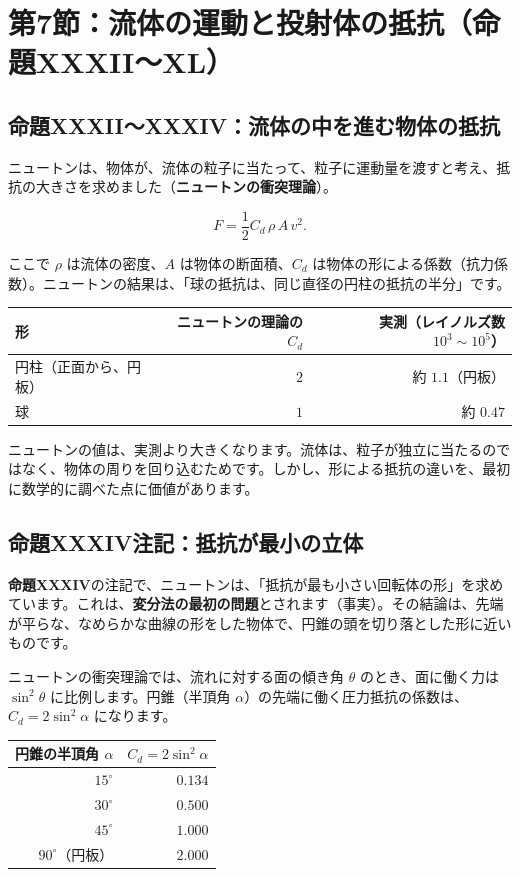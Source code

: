 \documentclass[a4paper,11pt,openany]{ltjsbook}
\begin{document}
\section{第7節：流体の運動と投射体の抵抗（命題XXXII〜XL）}

\subsection{命題XXXII〜XXXIV：流体の中を進む物体の抵抗}

ニュートンは、物体が、流体の粒子に当たって、粒子に運動量を渡すと考え、抵抗の大きさを求めました（\textbf{ニュートンの衝突理論}）。

\[
F=\frac12C_d\,\rho\,A\,v^2.
\]

ここで $\rho$ は流体の密度、$A$ は物体の断面積、$C_d$ は物体の形による係数（抗力係数）。ニュートンの結果は、「球の抵抗は、同じ直径の円柱の抵抗の半分」です。

\begin{center}
\begin{tabular}{lrr}
\toprule
形 & ニュートンの理論の $C_d$ & 実測（レイノルズ数 $10^3\sim10^5$）\\
\midrule
円柱（正面から、円板） & $2$ & 約 $1.1$（円板）\\
球 & $1$ & 約 $0.47$\\
\bottomrule
\end{tabular}
\end{center}

ニュートンの値は、実測より大きくなります。流体は、粒子が独立に当たるのではなく、物体の周りを回り込むためです。しかし、形による抵抗の違いを、最初に数学的に調べた点に価値があります。

\subsection{命題XXXIV注記：抵抗が最小の立体}

\textbf{命題XXXIV}の注記で、ニュートンは、「抵抗が最も小さい回転体の形」を求めています。これは、\textbf{変分法の最初の問題}とされます（事実）。その結論は、先端が平らな、なめらかな曲線の形をした物体で、円錐の頭を切り落とした形に近いものです。

ニュートンの衝突理論では、流れに対する面の傾き角 $\theta$ のとき、面に働く力は $\sin^2\theta$ に比例します。円錐（半頂角 $\alpha$）の先端に働く圧力抵抗の係数は、$C_d=2\sin^2\alpha$ になります。

\begin{center}
\begin{tabular}{rr}
\toprule
円錐の半頂角 $\alpha$ & $C_d=2\sin^2\alpha$\\
\midrule
$15^\circ$ & $0.134$\\
$30^\circ$ & $0.500$\\
$45^\circ$ & $1.000$\\
$90^\circ$（円板） & $2.000$\\
\bottomrule
\end{tabular}
\end{center}
\end{document}
